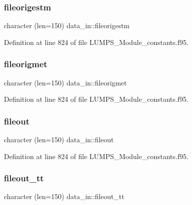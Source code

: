 \subsubsection{\texorpdfstring{fileorigestm}{fileorigestm}}
{\footnotesize\ttfamily character (len=150) data\+\_\+in\+::fileorigestm}



Definition at line 824 of file L\+U\+M\+P\+S\+\_\+\+Module\+\_\+constants.\+f95.

\mbox{\label{namespacedata__in_aa954c0fba57d9145cc0c6336009d06bf}} 
\subsubsection{\texorpdfstring{fileorigmet}{fileorigmet}}
{\footnotesize\ttfamily character (len=150) data\+\_\+in\+::fileorigmet}



Definition at line 824 of file L\+U\+M\+P\+S\+\_\+\+Module\+\_\+constants.\+f95.

\mbox{\label{namespacedata__in_ac2b450671084fe099a448b9041377812}} 
\subsubsection{\texorpdfstring{fileout}{fileout}}
{\footnotesize\ttfamily character (len=150) data\+\_\+in\+::fileout}



Definition at line 824 of file L\+U\+M\+P\+S\+\_\+\+Module\+\_\+constants.\+f95.

\mbox{\label{namespacedata__in_a0bc6e84d091c3af529338729ef26182a}} 
\subsubsection{\texorpdfstring{fileout\+\_\+tt}{fileout\_tt}}
{\footnotesize\ttfamily character (len=150) data\+\_\+in\+::fileout\+\_\+tt}



